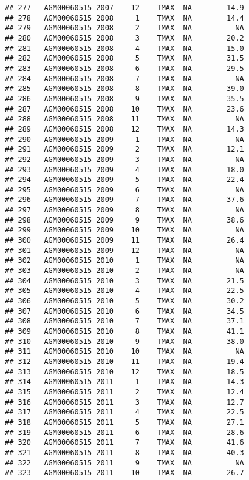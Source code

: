 \documentclass{article}\usepackage[]{graphicx}\usepackage[]{color}
\makeatletter
\newenvironment{kframe}{%
 \def\at@end@of@kframe{}%
 \ifinner\ifhmode%
  \def\at@end@of@kframe{\end{minipage}}%
  \begin{minipage}{\columnwidth}%
 \fi\fi%
 \def\FrameCommand##1{\hskip\@totalleftmargin \hskip-\fboxsep
 \colorbox{shadecolor}{##1}\hskip-\fboxsep
     \hskip-\linewidth \hskip-\@totalleftmargin \hskip\columnwidth}%
 \MakeFramed {\advance\hsize-\width
   \@totalleftmargin\z@ \linewidth\hsize
   \@setminipage}}%
 {\par\unskip\endMakeFramed%
 \at@end@of@kframe}
\newenvironment{knitrout}{}{} %
\makeatother
\begin{document}
\begin{knitrout}
\begin{kframe}
\begin{verbatim}
## 277   AGM00060515 2007    12    TMAX  NA        14.9
## 278   AGM00060515 2008     1    TMAX  NA        14.4
## 279   AGM00060515 2008     2    TMAX  NA          NA
## 280   AGM00060515 2008     3    TMAX  NA        20.2
## 281   AGM00060515 2008     4    TMAX  NA        15.0
## 282   AGM00060515 2008     5    TMAX  NA        31.5
## 283   AGM00060515 2008     6    TMAX  NA        29.5
## 284   AGM00060515 2008     7    TMAX  NA          NA
## 285   AGM00060515 2008     8    TMAX  NA        39.0
## 286   AGM00060515 2008     9    TMAX  NA        35.5
## 287   AGM00060515 2008    10    TMAX  NA        23.6
## 288   AGM00060515 2008    11    TMAX  NA          NA
## 289   AGM00060515 2008    12    TMAX  NA        14.3
## 290   AGM00060515 2009     1    TMAX  NA          NA
## 291   AGM00060515 2009     2    TMAX  NA        12.1
## 292   AGM00060515 2009     3    TMAX  NA          NA
## 293   AGM00060515 2009     4    TMAX  NA        18.0
## 294   AGM00060515 2009     5    TMAX  NA        22.4
## 295   AGM00060515 2009     6    TMAX  NA          NA
## 296   AGM00060515 2009     7    TMAX  NA        37.6
## 297   AGM00060515 2009     8    TMAX  NA          NA
## 298   AGM00060515 2009     9    TMAX  NA        38.6
## 299   AGM00060515 2009    10    TMAX  NA          NA
## 300   AGM00060515 2009    11    TMAX  NA        26.4
## 301   AGM00060515 2009    12    TMAX  NA          NA
## 302   AGM00060515 2010     1    TMAX  NA          NA
## 303   AGM00060515 2010     2    TMAX  NA          NA
## 304   AGM00060515 2010     3    TMAX  NA        21.5
## 305   AGM00060515 2010     4    TMAX  NA        22.5
## 306   AGM00060515 2010     5    TMAX  NA        30.2
## 307   AGM00060515 2010     6    TMAX  NA        34.5
## 308   AGM00060515 2010     7    TMAX  NA        37.1
## 309   AGM00060515 2010     8    TMAX  NA        41.1
## 310   AGM00060515 2010     9    TMAX  NA        38.0
## 311   AGM00060515 2010    10    TMAX  NA          NA
## 312   AGM00060515 2010    11    TMAX  NA        19.4
## 313   AGM00060515 2010    12    TMAX  NA        18.5
## 314   AGM00060515 2011     1    TMAX  NA        14.3
## 315   AGM00060515 2011     2    TMAX  NA        12.4
## 316   AGM00060515 2011     3    TMAX  NA        12.7
## 317   AGM00060515 2011     4    TMAX  NA        22.5
## 318   AGM00060515 2011     5    TMAX  NA        27.1
## 319   AGM00060515 2011     6    TMAX  NA        28.6
## 320   AGM00060515 2011     7    TMAX  NA        41.6
## 321   AGM00060515 2011     8    TMAX  NA        40.3
## 322   AGM00060515 2011     9    TMAX  NA          NA
## 323   AGM00060515 2011    10    TMAX  NA        26.7

\end{verbatim}
\end{kframe}
\end{knitrout}
\end{document}
